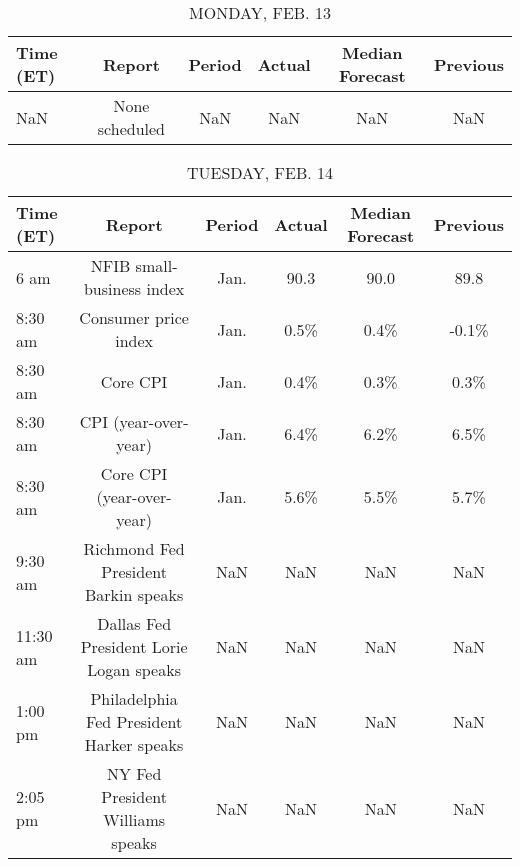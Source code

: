 \documentclass{article}%
\begin{document}
%
\normalsize%


\begin{table}[htbp]%
\caption{MONDAY, FEB. 13}%
\centering%
\begin{adjustbox}{width=1\textwidth}%
\begin{tabular}{lccccc}
\toprule
Time (ET) &         Report & Period & Actual & Median Forecast & Previous \\
\midrule
      NaN & None scheduled &    NaN &    NaN &             NaN &      NaN \\
\bottomrule
\end{tabular}
%
\end{adjustbox}%
\end{table}

%


\begin{table}[htbp]%
\caption{TUESDAY, FEB. 14}%
\centering%
\begin{adjustbox}{width=1\textwidth}%
\begin{tabular}{lccccc}
\toprule
Time (ET) &                                   Report & Period & Actual & Median Forecast & Previous \\
\midrule
     6 am &                NFIB small-business index &   Jan. &   90.3 &            90.0 &     89.8 \\
  8:30 am &                     Consumer price index &   Jan. &   0.5\% &            0.4\% &    -0.1\% \\
  8:30 am &                                 Core CPI &   Jan. &   0.4\% &            0.3\% &     0.3\% \\
  8:30 am &                     CPI (year-over-year) &   Jan. &   6.4\% &            6.2\% &     6.5\% \\
  8:30 am &                Core CPI (year-over-year) &   Jan. &   5.6\% &            5.5\% &     5.7\% \\
  9:30 am &     Richmond Fed President Barkin speaks &    NaN &    NaN &             NaN &      NaN \\
 11:30 am &  Dallas Fed President Lorie Logan speaks &    NaN &    NaN &             NaN &      NaN \\
  1:00 pm & Philadelphia Fed President Harker speaks &    NaN &    NaN &             NaN &      NaN \\
  2:05 pm &         NY Fed President Williams speaks &    NaN &    NaN &             NaN &      NaN \\
\bottomrule
\end{tabular}
%
\end{adjustbox}%
\end{table}
\end{document}
